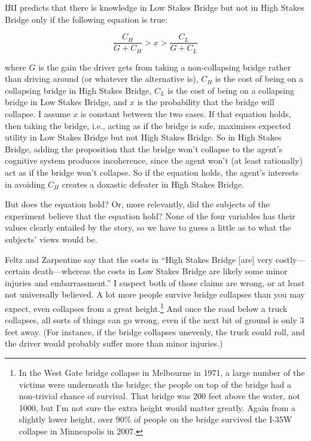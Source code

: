\documentclass[oneside, a4paper]{book}
\begin{document}
IRI predicts that there is knowledge in Low Stakes Bridge but not in High Stakes Bridge only if the following equation is true:

\begin{equation*}
\frac{C_H}{G + C_H} > x > \frac{C_L}{G + C_L}
\end{equation*}

\noindent where $G$ is the gain the driver gets from taking a non-collapsing bridge rather than driving around (or whatever the alternative is), $C_H$ is the cost of being on a collapsing bridge in High Stakes Bridge, $C_L$ is the cost of being on a collapsing bridge in Low Stakes Bridge, and $x$ is the probability that the bridge will collapse. I assume $x$ is constant between the two cases. If that equation holds, then taking the bridge, i.e., acting as if the bridge is safe, maximises expected utility in Low Stakes Bridge but not High Stakes Bridge. So in High Stakes Bridge, adding the proposition that the bridge won't collapse to the agent's cognitive system produces incoherence, since the agent won't (at least rationally) act as if the bridge won't collapse. So if the equation holds, the agent's interests in avoiding $C_H$ creates a doxastic defeater in High Stakes Bridge.

But does the equation hold? Or, more relevantly, did the subjects of the experiment believe that the equation hold? None of the four variables has their values clearly entailed by the story, so we have to guess a little as to what the subjects' views would be. 

Feltz and Zarpentine say that the costs in ``High Stakes Bridge [are] very costly---certain death---whereas the costs in Low Stakes Bridge are likely some minor injuries and embarrassment.'' \cite[??]{FeltzZarpentine2010} I suspect both of those claims are wrong, or at least not universally believed. A lot more people survive bridge collapses than you may expect, even collapses from a great height.\footnote{In the West Gate bridge collapse in Melbourne in 1971, a large number of the victims were underneath the bridge; the people on top of the bridge had a non-trivial chance of survival. That bridge was 200 feet above the water, not 1000, but I'm not sure the extra height would matter greatly. Again from a slightly lower height, over 90\% of people on the bridge survived the I-35W collapse in Minneapolis in 2007.} And once the road below a truck collapses, all sorts of things can go wrong, even if the next bit of ground is only 3 feet away. (For instance, if the bridge collapses unevenly, the truck could roll, and the driver would probably suffer more than minor injuries.)
\end{document}
